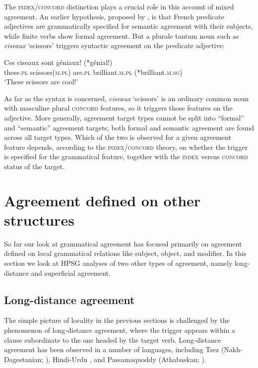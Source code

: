 \documentclass[output=paper
                ,modfonts
                ,nonflat
	        ,collection
	        ,collectionchapter
	        ,collectiontoclongg
 	        ,biblatex
                ,babelshorthands
                ,newtxmath
                ,draftmode
                ,colorlinks, citecolor=brown
]{./langsci/langscibook}
\begin{document}
{The \textsc{index/concord} distinction plays a crucial role in this account of mixed agreement.  An earlier hypothesis, proposed by \citet{Kathol99b}, is that French predicate adjectives are grammatically specified for semantic  agreement with their subjects, while finite verbs show formal agreement.  But a plurale tantum noun such as \textit{ciseaux} `scissors’ triggers syntactic agreement on the predicate adjective:
	
\begin{exe} 
\ex\label{ciseaux}
\gll   Ces	ciseaux	sont	g\'{e}niaux!	(*g\'{e}nial!) \\
		these.\textsc{pl}	scissors(\textsc{m.pl})	are.\textsc{pl} 	brilliant.\textsc{m.pl}	(*brilliant.\textsc{m.sg}) \\
\glt		`These scissors are cool!’ 
\end{exe}

\noindent
As far as the syntax is concerned, \textit{ciseaux} `scissors’ is an ordinary common noun with masculine plural \textsc{concord} features, so it triggers those features on the adjective.  More generally, agreement target types cannot be split into ``formal'' and ``semantic'' agreement targets; both formal and semantic agreement are found across all target types.  Which of the two is observed for a given agreement feature depends, according to the  \textsc{index/concord}  theory,  on whether the trigger is specified for the grammatical feature, together with the  \textsc{index}  versus  \textsc{concord}  status of the target.  
 

\section{Agreement defined on other structures}
So far our look at grammatical agreement has focused primarily on agreement defined on local grammatical relations like subject, object, and modifier.  In this section we look at HPSG analyses of two other types of agreement, namely long-distance and superficial agreement.  

\subsection{Long-distance agreement}
\label{LDA}

The simple picture of locality in the previous sections is challenged by the phenomenon of long-distance agreement, where the trigger appears within a clause subordinate to the one headed by the target verb.  Long-distance agreement has been observed in a number of languages, including Tsez (Nakh-Dagestanian; \citealt{polinsky+potsdam:2001}), Hindi-Urdu \citep{bhatt:2005}, and Passamaquoddy (Athabaskan; \citealt{bruening:2001,LeSourd:2018}).  

}
\end{document}
